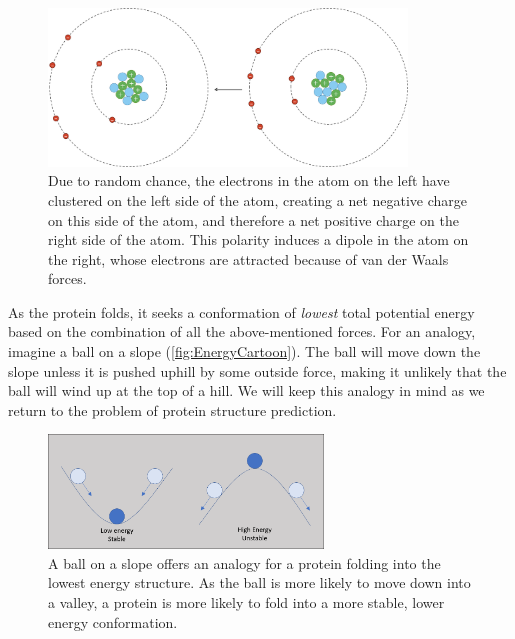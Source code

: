 
\begin{figure}[h]
	\centering
	\mySfFamily
	\includegraphics[width = 0.85\textwidth]{../images/van_der_waals.png}
	\caption{Due to random chance, the electrons in the atom on the left have clustered on the left side of the atom, creating a net negative charge on this side of the atom, and therefore a net positive charge on the right side of the atom. This polarity induces a dipole in the atom on the right, whose electrons are attracted because of van der Waals forces.}
	\label{fig:van_der_waals}
\end{figure}

As the protein folds, it seeks a conformation of \textit{lowest} total potential energy based on the combination of all the above-mentioned forces. For an analogy, imagine a ball on a slope (\autoref{fig:EnergyCartoon}). The ball will move down the slope unless it is pushed uphill by some outside force, making it unlikely that the ball will wind up at the top of a hill. We will keep this analogy in mind as we return to the problem of protein structure prediction.\\

\begin{figure}[h]
	\centering
	\mySfFamily
	\includegraphics[width = 0.65\textwidth]{../images/EnergyCartoon.png}
	\caption{A ball on a slope offers an analogy for a protein folding into the lowest energy structure. As the ball is more likely to move down into a valley, a protein is more likely to fold into a more stable, lower energy conformation.}
	\label{fig:EnergyCartoon}
\end{figure}

